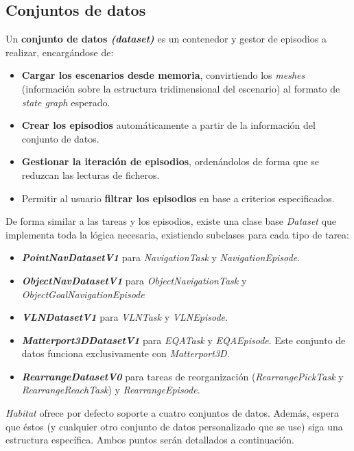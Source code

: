 \subsection{Conjuntos de datos}

Un \textbf{conjunto de datos \textit{(dataset)}} es un contenedor y gestor de episodios a realizar, encargándose de:

\begin{itemize}
	\item \textbf{Cargar los escenarios desde memoria}, convirtiendo los \textit{meshes} (información sobre la estructura tridimensional del escenario) al formato de \textit{state graph} esperado.
	\item \textbf{Crear los episodios} automáticamente a partir de la información del conjunto de datos.
	\item \textbf{Gestionar la iteración de episodios}, ordenándolos de forma que se reduzcan las lecturas de ficheros.
	\item Permitir al usuario \textbf{filtrar los episodios} en base a criterios especificados.
\end{itemize}

De forma similar a las tareas y los episodios, existe una clase base \textit{Dataset} que implementa toda la lógica necesaria, existiendo subclases para cada tipo de tarea:

\begin{itemize}
\item \textbf{\textbf{\textit{PointNavDatasetV1}}} para \textit{NavigationTask} y \textit{NavigationEpisode}.
\item \textbf{\textit{ObjectNavDatasetV1}} para \textit{ObjectNavigationTask} y \textit{ObjectGoalNavigationEpisode}
\item \textbf{\textit{VLNDatasetV1}} para \textit{VLNTask} y \textit{VLNEpisode}.
\item \textbf{\textit{Matterport3DDatasetV1}} para \textit{EQATask} y \textit{EQAEpisode}. Este conjunto de datos funciona exclusivamente con \textit{Matterport3D}.
\item \textbf{\textit{RearrangeDatasetV0}} para tareas de reorganización (\textit{RearrangePickTask} y \textit{RearrangeReachTask}) y \textit{RearrangeEpisode}.
\end{itemize}

\textit{Habitat} ofrece por defecto soporte a cuatro conjuntos de datos. Además, espera que éstos (y cualquier otro conjunto de datos personalizado que se use) siga una estructura específica. Ambos puntos serán detallados a continuación.

